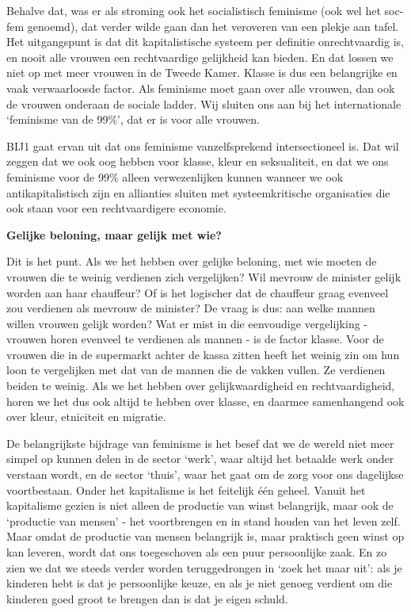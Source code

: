 Behalve dat, was er als stroming ook het socialistisch feminisme (ook
wel het soc-fem genoemd), dat verder wilde gaan dan het veroveren van
een plekje aan tafel. Het uitgangspunt is dat dit kapitalistische
systeem per definitie onrechtvaardig is, en nooit alle vrouwen een
rechtvaardige gelijkheid kan bieden. En dat lossen we niet op met meer
vrouwen in de Tweede Kamer. Klasse is dus een belangrijke en vaak
verwaarloosde factor. Als feminisme moet gaan over alle vrouwen, dan ook
de vrouwen onderaan de sociale ladder. Wij sluiten ons aan bij het
internationale `feminisme van de 99\%', dat er is voor alle vrouwen.

BIJ1 gaat ervan uit dat ons feminisme vanzelfsprekend intersectioneel
is. Dat wil zeggen dat we ook oog hebben voor klasse, kleur en
seksualiteit, en dat we ons feminisme voor de 99\% alleen verwezenlijken
kunnen wanneer we ook antikapitalistisch zijn en allianties sluiten met
systeemkritische organisaties die ook staan voor een rechtvaardigere
economie.

\textbf{Gelijke beloning, maar gelijk met wie?}

Dit is het punt. Als we het hebben over gelijke beloning, met wie moeten
de vrouwen die te weinig verdienen zich vergelijken? Wil mevrouw de
minister gelijk worden aan haar chauffeur? Of is het logischer dat de
chauffeur graag evenveel zou verdienen als mevrouw de minister? De vraag
is dus: aan welke mannen willen vrouwen gelijk worden? Wat er mist in
die eenvoudige vergelijking - vrouwen horen evenveel te verdienen als
mannen - is de factor klasse. Voor de vrouwen die in de supermarkt
achter de kassa zitten heeft het weinig zin om hun loon te vergelijken
met dat van de mannen die de vakken vullen. Ze verdienen beiden te
weinig. Als we het hebben over gelijkwaardigheid en rechtvaardigheid,
horen we het dus ook altijd te hebben over klasse, en daarmee
samenhangend ook over kleur, etniciteit en migratie.

De belangrijkste bijdrage van feminisme is het besef dat we de wereld
niet meer simpel op kunnen delen in de sector `werk', waar altijd het
betaalde werk onder verstaan wordt, en de sector `thuis', waar het gaat
om de zorg voor ons dagelijkse voortbestaan. Onder het kapitalisme is
het feitelijk één geheel. Vanuit het kapitalisme gezien is niet alleen
de productie van winst belangrijk, maar ook de `productie van mensen' -
het voortbrengen en in stand houden van het leven zelf. Maar omdat de
productie van mensen belangrijk is, maar praktisch geen winst op kan
leveren, wordt dat ons toegeschoven als een puur persoonlijke zaak. En
zo zien we dat we steeds verder worden teruggedrongen in `zoek het maar
uit': als je kinderen hebt is dat je persoonlijke keuze, en als je niet
genoeg verdient om die kinderen goed groot te brengen dan is dat je
eigen schuld.

